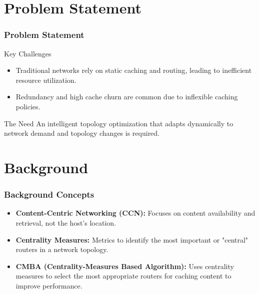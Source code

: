 \documentclass{beamer}
\begin{document}
\section{Problem Statement}
\begin{frame}
  \frametitle{Problem Statement}
  \begin{block}{Key Challenges}
    \begin{itemize}
      \item Traditional networks rely on static caching and routing, leading to inefficient resource utilization.
      \item Redundancy and high cache churn are common due to inflexible caching policies.
    \end{itemize}
  \end{block}
  \begin{alertblock}{The Need}
    An intelligent topology optimization that adapts dynamically to network demand and topology changes is required.
  \end{alertblock}
\end{frame}

\section{Background}
\begin{frame}
  \frametitle{Background Concepts}
  \begin{itemize}
    \item \textbf{Content-Centric Networking (CCN):} Focuses on content availability and retrieval, not the host's location.
    \item \textbf{Centrality Measures:} Metrics to identify the most important or "central" routers in a network topology.
    \item \textbf{CMBA (Centrality-Measures Based Algorithm):} Uses centrality measures to select the most appropriate routers for caching content to improve performance.
  \end{itemize}
\end{frame}
\end{document}
